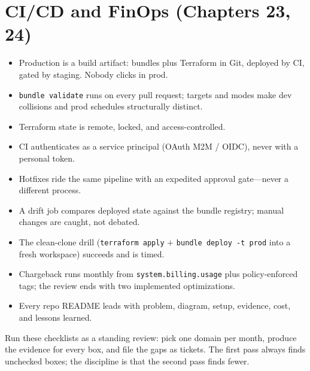 \section{CI/CD and FinOps (Chapters 23, 24)}
%
\begin{itemize}
    \item[$\square$] Production is a build artifact: bundles plus Terraform in Git, deployed by
    CI, gated by staging. Nobody clicks in prod.
    \item[$\square$] \texttt{bundle validate} runs on every pull request; targets and modes make
    dev collisions and prod schedules structurally distinct.
    \item[$\square$] Terraform state is remote, locked, and access-controlled.
    \item[$\square$] CI authenticates as a service principal (OAuth M2M / OIDC), never with a
    personal token.
    \item[$\square$] Hotfixes ride the same pipeline with an expedited approval gate---never a
    different process.
    \item[$\square$] A drift job compares deployed state against the bundle registry; manual
    changes are caught, not debated.
    \item[$\square$] The clean-clone drill (\texttt{terraform apply} $+$
    \texttt{bundle deploy -t prod} into a fresh workspace) succeeds and is timed.
    \item[$\square$] Chargeback runs monthly from \texttt{system.billing.usage} plus
    policy-enforced tags; the review ends with two implemented optimizations.
    \item[$\square$] Every repo README leads with problem, diagram, setup, evidence, cost, and
    lessons learned.
\end{itemize}

\begin{tipbox}
Run these checklists as a standing review: pick one domain per month, produce the evidence
for every box, and file the gaps as tickets. The first pass always finds unchecked boxes; the
discipline is that the second pass finds fewer.
\end{tipbox}
